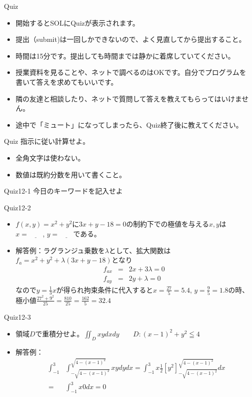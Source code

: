 \begin{slide}{Quiz}
\begin{itemize}
\item 開始するとSOLにQuizが表示されます。
\item 提出（submit)は一回しかできないので、よく見直してから提出すること。
\item 時間は15分です。提出しても時間までは静かに着席していてください。
\item 授業資料を見ることや、ネットで調べるのはOKです。自分でプログラムを書いて答えを求めてもいいです。
\item 隣の友達と相談したり、ネットで質問して答えを教えてもらってはいけません。
\item 途中で「ミュート」になってしまったら、Quiz終了後に教えてください。
\end{itemize}
\end{slide}
\begin{slide}{Quiz}
指示に従い計算せよ。
\begin{itemize}
\item 全角文字は使わない。
\item 数値は既約分数を用いて書くこと。
\end{itemize}
\end{slide}
\begin{slide}{Quiz12-1}
今日のキーワードを記入せよ
\end{slide}
\begin{slide}{Quiz12-2}
\begin{itemize}
\item $f(x,y) = x^2 + y^2$に$3x+y-18=0$の制約下での極値を与える$x,y$は$x= \underline{\qquad} $, $y= \underline{\qquad}$である。
\item 解答例：ラグランジュ乗数を$\lambda$として、拡大関数は
$f_a = x^2+y^2 + \lambda(3x+y-18)$となり
\begin{eqnarray}
f_{ax} &=& 2x + 3\lambda = 0 \nonumber \\
f_{ay} &=& 2y + \lambda =0 \nonumber
\end{eqnarray}
なので$y=\frac{1}{3}x$が得られ拘束条件に代入すると$x=\frac{27}{5}=5.4$, $y=\frac{9}{5}=1.8$の時、極小値$\frac{27^2+9^2}{25} = \frac{810}{25} = \frac{162}{5} = 32.4$
\end{itemize}
\end{slide}

\begin{slide}{Quiz12-3}
\begin{itemize}
\item 領域$D$で重積分せよ。$\iint_D xy dxdy \qquad D: (x-1)^2+ y^2 \leqq 4$
\item 解答例：
\begin{eqnarray}
&\int_{-1}^3& \int_{-\sqrt{4-(x-1)^2}}^{\sqrt{4-(x-1)^2}} xy dy dx= \int_{-1}^3 x\frac{1}{2}\left[y^2\right]_{-\sqrt{4-(x-1)^2}}^{\sqrt{4-(x-1)^2}} dx \nonumber \\
&=& \int_{-1}^3 x0dx = 0 \nonumber
\end{eqnarray}
\end{itemize}
\end{slide}
 
